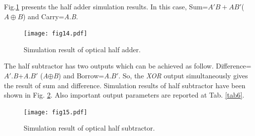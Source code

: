 \documentclass{osa-article}
\begin{document}
\begin{table}[H]
\caption{The parameters of flower-like structure  as optical half adder.}
\centering 
{}
\label{tab5} %
\end{table}

Fig.\ref{fig14} presents the half adder simulation results. In this case, Sum=$A'B+AB'$($A\oplus B$) and Carry=\textit {A}.\textit {B}.
   \begin{figure}[tb]
\centering
\texttt{[image: fig14.pdf]}
	\caption{Simulation result of optical half adder.}
	\label{fig14}
\end{figure}

The half subtractor has two outputs which can be achieved as follow. Difference=$A'$.\textit {B}+\textit {A}.$B'$ (\textit {A}$\oplus$\textit {B}) and Borrow=\textit {A}.$B'$. So, the \textit{XOR} output simultaneously gives the result of sum and difference. Simulation results of half subtractor have been shown in Fig. \ref{fig15}. Also important output parameters are reported at Tab. \ref{tab6}.
   \begin{figure}[tb]
\centering
\texttt{[image: fig15.pdf]}
	\caption{Simulation result of optical half subtractor.}
	\label{fig15}
\end{figure}
\end{document}
